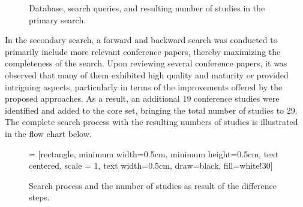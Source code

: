 \documentclass[runningheads]{llncs}
\begin{document}
\begin{figure}
\caption{Database, search queries, and resulting number of studies in the primary search.}
\end{figure}
\noindent
In the secondary search, a forward and backward search was conducted to primarily include more relevant conference papers, thereby maximizing the completeness of the search. Upon reviewing several conference papers, it was observed that many of them exhibited high quality and maturity or provided intriguing aspects, particularly in terms of the improvements offered by the proposed approaches. As a result, an additional 19 conference studies were identified and added to the core set, bringing the total number of studies to 29.
The complete search process with the resulting numbers of studies is illustrated in the flow chart below.\\

\begin{figure}[H]
 = [rectangle, 
minimum width=0.5cm, 
minimum height=0.5cm, 
text centered, 
scale = 1,
text width=0.5cm, 
draw=black, 
fill=white!30]

\caption{Search process and the number of studies as result of the difference steps.}
\end{figure}
\end{document}
